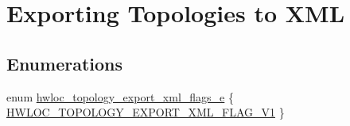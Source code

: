 \hypertarget{a00206}{}\section{Exporting Topologies to X\+ML}
\label{a00206}
\subsection*{Enumerations}
\begin{DoxyCompactItemize}
\item 
enum \hyperlink{a00206_ga0eb99636aff71fe2704e1fa0ffe8c18d}{hwloc\+\_\+topology\+\_\+export\+\_\+xml\+\_\+flags\+\_\+e} \{ \hyperlink{a00206_gga0eb99636aff71fe2704e1fa0ffe8c18dae7d6d96546131ef0043867b836b02e0f}{H\+W\+L\+O\+C\+\_\+\+T\+O\+P\+O\+L\+O\+G\+Y\+\_\+\+E\+X\+P\+O\+R\+T\+\_\+\+X\+M\+L\+\_\+\+F\+L\+A\+G\+\_\+\+V1}
 \}
\end{DoxyCompactItemize}
